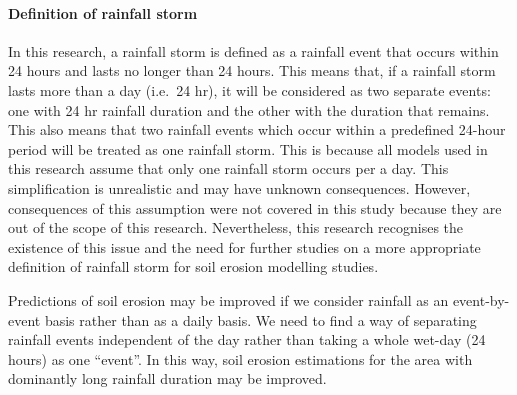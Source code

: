 \paragraph{Definition of rainfall storm} In this research, a rainfall storm
is defined as a rainfall event that occurs within 24 hours and lasts no longer
than 24 hours. This means that, if a rainfall storm lasts more than a day
(i.e.\ 24 hr), it will be considered as two separate events: one with 24 hr
rainfall duration and the other with the duration that remains. This also means
that two rainfall events which occur within a predefined 24-hour period will be
treated as one rainfall storm. This is because all models used in this research
assume that only one rainfall storm occurs per a day. This simplification is
unrealistic and may have unknown consequences. However, consequences of this
assumption were not covered in this study because they are out of the scope of
this research. Nevertheless, this research recognises the existence of this
issue and the need for further studies on a more appropriate definition of
rainfall storm for soil erosion modelling studies.

Predictions of soil erosion may be improved if we consider rainfall as an
event-by-event basis rather than as a daily basis.  We need to find a way of
separating rainfall events independent of the day rather than taking
a whole wet-day (24 hours) as one ``event''. In this way, soil erosion
estimations for the area with dominantly long rainfall duration may be improved.


